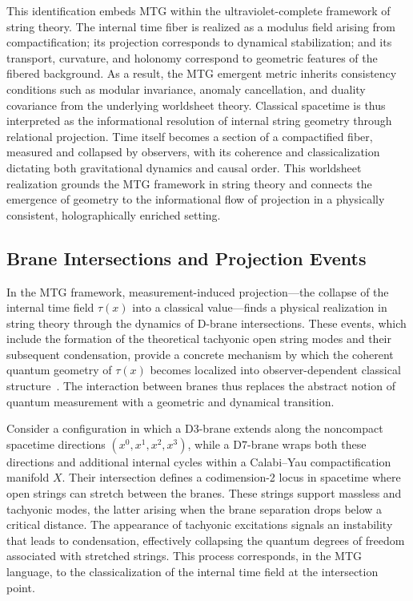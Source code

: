 \documentclass[11pt]{article}
\begin{document}
This identification embeds MTG within the ultraviolet-complete framework of string theory. The internal time fiber is realized as a modulus field arising from compactification; its projection corresponds to dynamical stabilization; and its transport, curvature, and holonomy correspond to geometric features of the fibered background. As a result, the MTG emergent metric inherits consistency conditions such as modular invariance, anomaly cancellation, and duality covariance from the underlying worldsheet theory. Classical spacetime is thus interpreted as the informational resolution of internal string geometry through relational projection. Time itself becomes a section of a compactified fiber, measured and collapsed by observers, with its coherence and classicalization dictating both gravitational dynamics and causal order. This worldsheet realization grounds the MTG framework in string theory and connects the emergence of geometry to the informational flow of projection in a physically consistent, holographically enriched setting.
\subsection{Brane Intersections and Projection Events}
In the MTG framework, measurement-induced projection---the collapse of the internal time field \( \tau(x) \) into a classical value---finds a physical realization in string theory through the dynamics of D-brane intersections. These events, which include the  formation of the theoretical tachyonic open string modes and their subsequent condensation, provide a concrete mechanism by which the coherent quantum geometry of \( \tau(x) \) becomes localized into observer-dependent classical structure~\cite{sen2002tachyon}. The interaction between branes thus replaces the abstract notion of quantum measurement with a geometric and dynamical transition.

Consider a configuration in which a D3-brane extends along the noncompact spacetime directions \( (x^0, x^1, x^2, x^3) \), while a D7-brane wraps both these directions and additional internal cycles within a Calabi--Yau compactification manifold \( X \). Their intersection defines a codimension-2 locus in spacetime where open strings can stretch between the branes. These strings support massless and tachyonic modes, the latter arising when the brane separation drops below a critical distance. The appearance of tachyonic excitations signals an instability that leads to condensation, effectively collapsing the quantum degrees of freedom associated with stretched strings. This process corresponds, in the MTG language, to the classicalization of the internal time field at the intersection point.
\end{document}
